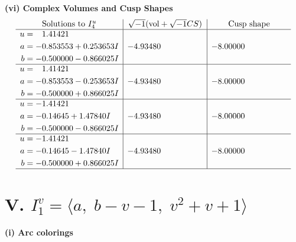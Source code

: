 \documentclass[1p]{elsarticle_modified}
\theoremstyle{definition}
\newcommand{\I}{\sqrt{-1}}
\begin{document}
\newpage\flushleft \textbf{(vi) Complex Volumes and Cusp Shapes}
$$\begin{array}{c|c|c}  
\text{Solutions to }I^u_{4}& \I (\text{vol} + \sqrt{-1}CS) & \text{Cusp shape}\\
 \hline 
\begin{aligned}
u &= \phantom{-}1.41421\phantom{ +0.000000I} \\
a &= -0.853553 + 0.253653 I \\
b &= -0.500000 - 0.866025 I\end{aligned}
 & -4.93480\phantom{ +0.000000I} & -8.00000\phantom{ +0.000000I} \\ \hline\begin{aligned}
u &= \phantom{-}1.41421\phantom{ +0.000000I} \\
a &= -0.853553 - 0.253653 I \\
b &= -0.500000 + 0.866025 I\end{aligned}
 & -4.93480\phantom{ +0.000000I} & -8.00000\phantom{ +0.000000I} \\ \hline\begin{aligned}
u &= -1.41421\phantom{ +0.000000I} \\
a &= -0.14645 + 1.47840 I \\
b &= -0.500000 - 0.866025 I\end{aligned}
 & -4.93480\phantom{ +0.000000I} & -8.00000\phantom{ +0.000000I} \\ \hline\begin{aligned}
u &= -1.41421\phantom{ +0.000000I} \\
a &= -0.14645 - 1.47840 I \\
b &= -0.500000 + 0.866025 I\end{aligned}
 & -4.93480\phantom{ +0.000000I} & -8.00000\phantom{ +0.000000I}\\
 \hline 
 \end{array}$$\newpage\newpage\renewcommand{\arraystretch}{1}
\centering \section*{V. $I^v_{1}= \langle a,\;b- v-1,\;v^2+v+1 \rangle$}
\flushleft \textbf{(i) Arc colorings}\\
\end{document}
